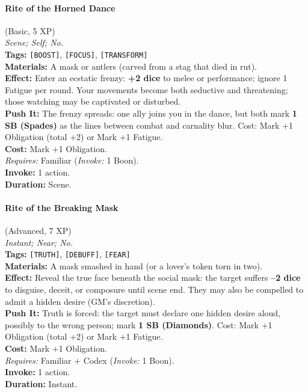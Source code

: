 \paragraph{Rite of the Horned Dance} (Basic, 5 XP) \hfill \\
\emph{Scene; Self; No.} \\
\textbf{Tags:} \texttt{[BOOST]}, \texttt{[FOCUS]}, \texttt{[TRANSFORM]} \\
\textbf{Materials:} A mask or antlers (carved from a stag that died in rut). \\
\textbf{Effect:} Enter an ecstatic frenzy: \textbf{+2 dice} to melee or performance; ignore 1 Fatigue per round. Your movements become both seductive and threatening; those watching may be captivated or disturbed. \\
\textbf{Push It:} The frenzy spreads: one ally joins you in the dance, but both mark \textbf{1 SB (Spades)} as the lines between combat and carnality blur. Cost: Mark +1 Obligation (total +2) or Mark +1 Fatigue. \\
\textbf{Cost:} Mark +1 Obligation. \\
\textit{Requires:} Familiar (\textit{Invoke:} 1 Boon). \\
\textbf{Invoke:} 1 action. \\
\textbf{Duration:} Scene.

\paragraph{Rite of the Breaking Mask} (Advanced, 7 XP) \hfill \\
\emph{Instant; Near; No.} \\
\textbf{Tags:} \texttt{[TRUTH]}, \texttt{[DEBUFF]}, \texttt{[FEAR]} \\
\textbf{Materials:} A mask smashed in hand (or a lover's token torn in two). \\
\textbf{Effect:} Reveal the true face beneath the social mask: the target suffers \textbf{--2 dice} to disguise, deceit, or composure until scene end. They may also be compelled to admit a hidden desire (GM's discretion). \\
\textbf{Push It:} Truth is forced: the target must declare one hidden desire aloud, possibly to the wrong person; mark \textbf{1 SB (Diamonds)}. Cost: Mark +1 Obligation (total +2) or Mark +1 Fatigue. \\
\textbf{Cost:} Mark +1 Obligation. \\
\textit{Requires:} Familiar + Codex (\textit{Invoke:} 1 Boon). \\
\textbf{Invoke:} 1 action. \\
\textbf{Duration:} Instant.

